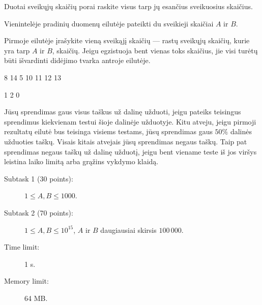 \documentclass{boi2014-lt}
\begin{document}
    Duotai sveikųjų skaičių porai raskite visus tarp jų esančius sveikuosius
    skaičius.

    \Input
    Vienintelėje pradinių duomenų eilutėje pateikti du sveikieji skaičiai
    $A$ ir $B$.

    \Output
    Pirmoje eilutėje įrašykite vieną sveikąjį skaičių --- rastų sveikųjų skaičių,
    kurie yra tarp $A$ ir $B$, skaičių. Jeigu egzistuoja bent vienas toks
    skaičius, jie visi turėtų būti išvardinti didėjimo tvarka antroje eilutėje.
    
    \Examples

    \simpleexample
    {
        8 14
    }
    {
        5  10 11 12 13
    }

    \simpleexample
    {
        1 2
    }
    {
        0
    }

    \Scoring
    Jūsų sprendimas gaus visus taškus už dalinę užduoti, jeigu pateiks teisingus
    sprendimus kiekvienam testui šioje dalinėje užduotyje. Kitu atveju, jeigu
    pirmoji rezultatų eilutė bus teisinga visiems testams, jūsų sprendimas gaus
    $50\%$ dalinės užduoties taškų. Visais kitais atvejais jūsų sprendimas negaus
    taškų. Taip pat sprendimas negaus taškų už dalinę užduotį, jeigu bent viename
    teste iš jos viršys leistina laiko limitą arba grąžins vykdymo klaidą.

    \begin{description}

        \item[Subtask 1 (30 points):] $1 \le A, B \le 1000$. 
        \item[Subtask 2 (70 points):] $1 \le A, B \le 10^{15}$,
            $A$ ir $B$ daugiausiai skirsis $100\,000$.
    \end{description}

    \Constraints

    \begin{description}
        \item[Time limit:] 1 s.
        \item[Memory limit:] 64 MB.
    \end{description}
\end{document}
